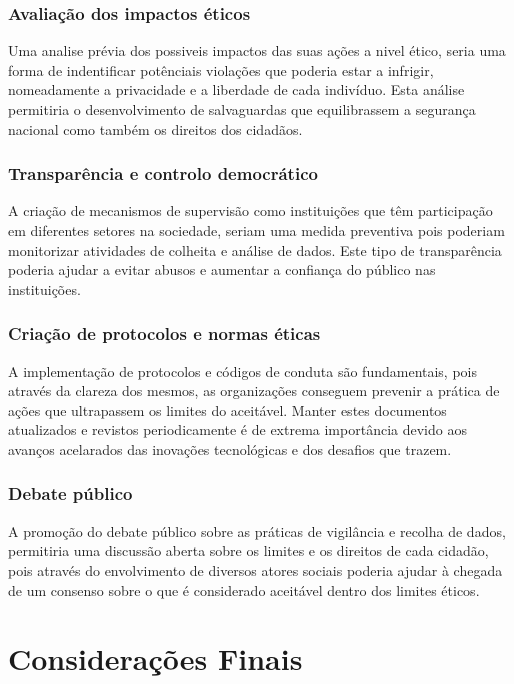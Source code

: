\documentclass[a4paper,12pt]{article}
\begin{document}
\subsubsection*{Avaliação dos impactos éticos}
Uma analise prévia dos possiveis impactos das suas ações a nivel ético, seria uma forma de indentificar potênciais violações que poderia estar a infrigir, nomeadamente a privacidade e a liberdade de cada indivíduo. Esta análise permitiria o desenvolvimento de salvaguardas que equilibrassem a segurança nacional como também os direitos dos cidadãos.

\subsubsection*{Transparência e controlo democrático}
A criação de mecanismos de supervisão como instituições que têm participação em diferentes setores na sociedade, seriam uma medida preventiva pois poderiam monitorizar atividades de colheita e análise de dados. Este tipo de transparência poderia ajudar a evitar abusos e aumentar a confiança do público nas instituições.

\subsubsection*{Criação de protocolos e normas éticas}
A implementação de protocolos e códigos de conduta são fundamentais, pois através da clareza dos mesmos, as organizações conseguem prevenir a prática de ações que ultrapassem os limites do aceitável. Manter estes documentos atualizados e revistos periodicamente é de extrema importância devido aos avanços acelarados das inovações tecnológicas e dos desafios que trazem.


\subsubsection*{Debate público}
A promoção do debate público sobre as práticas de vigilância e recolha de dados, permitiria uma discussão aberta sobre os limites e os direitos de cada cidadão, pois através do envolvimento de diversos atores sociais poderia ajudar à chegada de um consenso sobre o que é considerado aceitável dentro dos limites éticos. 



\section{Considerações Finais}
\end{document}

